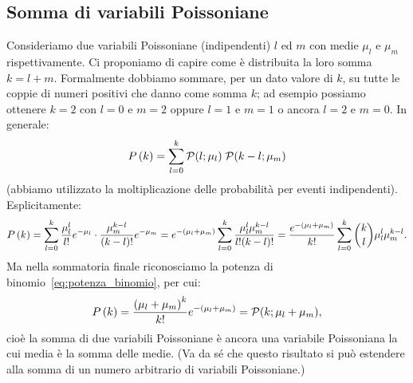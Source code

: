 %


\subsection{Somma di variabili Poissoniane}

Consideriamo due variabili Poissoniane (indipendenti) $l$ ed $m$ con medie
$\mu_l$ e $\mu_m$ rispettivamente. Ci proponiamo di capire come è distribuita
la loro somma $k = l + m$. Formalmente dobbiamo sommare, per un dato valore di
$k$, su tutte le coppie di numeri positivi che danno come somma $k$; ad
esempio possiamo ottenere $k = 2$ con $l = 0$ e $m = 2$ oppure
$l = 1$ e $m = 1$ o ancora $l = 2$ e $m = 0$. In generale:
\begin{align}
  \prob{k} = \sum_{l=0}^{k} \poissonpdf[\mu_l]{l}\; \poissonpdf[\mu_m]{k-l}
\end{align}
(abbiamo utilizzato la moltiplicazione delle probabilità per eventi
indipendenti). Esplicitamente:
\begin{align*}
  \displaystyle P\left(k\right) = \sum_{l=0}^{k} \frac{\mu_l^l}{l!}e^{-\mu_l} \cdot
  \frac{\mu_m^{k-l}}{(k-l)!}e^{-\mu_m} =
  e^{-(\mu_l+\mu_m)} \sum_{l=0}^{k} \frac{\mu_l^l\mu_m^{k-l}}{l!(k-l)!} =
  \frac{e^{-(\mu_l+\mu_m)}}{k!} \sum_{l=0}^{k} \binom{k}{l} \mu_l^l\mu_m^{k-l}.
\end{align*}
Ma nella sommatoria finale riconosciamo la potenza di
binomio~\eqref{eq:potenza_binomio}, per cui:
\begin{align}
  \prob{k} = \frac{\power[k]{\mu_l+\mu_m}}{k!}e^{-(\mu_l+\mu_m)} =
  \poissonpdf[\mu_l+\mu_m]{k},
\end{align}
cioè la somma di due variabili Poissoniane è ancora una variabile
Poissoniana la cui media è la somma delle medie. (Va da sé che questo
risultato si può estendere alla somma di un numero arbitrario di variabili
Poissoniane.)


